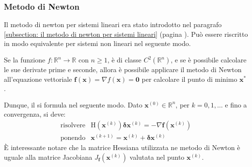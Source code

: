 \subsubsection{Metodo di Newton}

Il metodo di newton per sistemi lineari era stato introdotto nel paragrafo \ref{subsection: il metodo di newton per sistemi lineari} (pagina \pageref{subsection: il metodo di newton per sistemi lineari}). Può essere riscritto in modo equivalente per sistemi non lineari nel seguente modo.

\highspace
Se la funzione $f: \mathbb{R}^{n} \rightarrow \mathbb{R}$ con $n \ge 1$, è di classe $C^{2} \left(\mathbb{R}^{n}\right)$, e se è possibile calcolare le sue derivate prime e seconde, allora è possibile applicare il metodo di Newton all'equazione vettoriale $\mathbf{f}\left(\mathbf{x}\right) = \nabla f\left(\mathbf{x}\right) = \mathbf{0}$ per calcolare il punto di minimo $\mathbf{x}^{*}$.

\highspace
Dunque, il  si formula nel seguente modo. Dato $\mathbf{x}^{\left(0\right)} \in \mathbb{R}^{n}$, per $k = 0, 1, \dots$ e fino a convergenza, si deve:
\begin{equation}
	\begin{array}{ll}
		\text{risolvere} & \mathrm{H}\left(\mathbf{x}^{\left(k\right)}\right)\mathbf{\delta}\mathbf{x}^{\left(k\right)} = -\nabla \mathbf{f}\left(\mathbf{x}^{\left(k\right)}\right) \\ [1em]
		\text{ponendo} 	 & \mathbf{x}^{\left(k+1\right)} = \mathbf{x}^{\left(k\right)} + \mathbf{\delta}\mathbf{x}^{\left(k\right)}
	\end{array}
\end{equation}
È interessante notare che la matrice Hessiana utilizzata ne metodo di Newton è uguale alla matrice Jacobiana $J_{\mathbf{f}}\left(\mathbf{x}^{\left(k\right)}\right)$ valutata nel punto $\mathbf{x}^{\left(k\right)}$.

